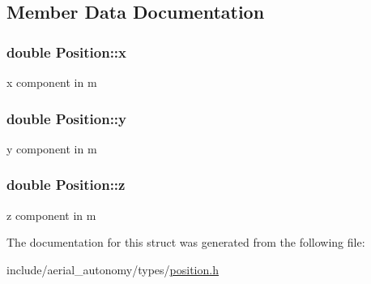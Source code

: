 \subsection{Member Data Documentation}
\hypertarget{structPosition_a9abbe738bad177de91fe4774099c1260}{
\subsubsection[{x}]{\setlength{\rightskip}{0pt plus 5cm}double Position\-::x}}\label{structPosition_a9abbe738bad177de91fe4774099c1260}


x component in m 

\hypertarget{structPosition_a75f48c2a1d2c7131b8be1a0687ae72c8}{
\subsubsection[{y}]{\setlength{\rightskip}{0pt plus 5cm}double Position\-::y}}\label{structPosition_a75f48c2a1d2c7131b8be1a0687ae72c8}


y component in m 

\hypertarget{structPosition_ab26043bc2f8f6094818c17dd44e43228}{
\subsubsection[{z}]{\setlength{\rightskip}{0pt plus 5cm}double Position\-::z}}\label{structPosition_ab26043bc2f8f6094818c17dd44e43228}


z component in m 



The documentation for this struct was generated from the following file\-:\begin{DoxyCompactItemize}
\item 
include/aerial\-\_\-autonomy/types/\hyperlink{position_8h}{position.\-h}\end{DoxyCompactItemize}
